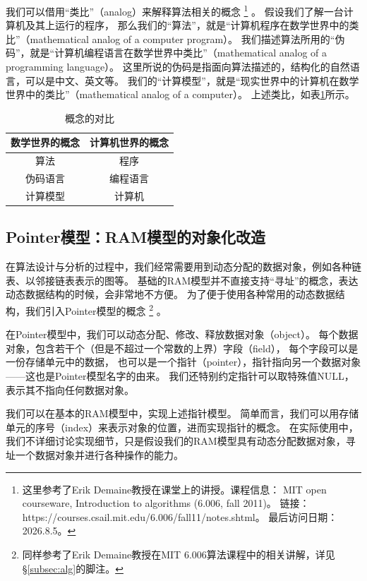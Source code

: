 我们可以借用“类比”（analog）来解释算法相关的概念
    \footnote{这里参考了Erik Demaine教授在课堂上的讲授。课程信息：
    MIT open courseware, Introduction to algorithms (6.006, fall 2011)。
    链接：https://courses.csail.mit.edu/6.006/fall11/notes.shtml。
    最后访问日期：2026.8.5。}
    。
假设我们了解一台计算机及其上运行的程序，
%
那么我们的“算法”，就是“计算机程序在数学世界中的类比”（mathematical analog of a computer program）。
%
我们描述算法所用的“伪码”，就是“计算机编程语言在数学世界中类比”（mathematical analog of a programming language）。
这里所说的伪码是指面向算法描述的，结构化的自然语言，可以是中文、英文等。
%
我们的“计算模型”，就是“现实世界中的计算机在数学世界中的类比”（mathematical analog of a computer）。
上述类比，如表\ref{tab:analog}所示。

\begin{table}[htbp]
    \centering
    \caption{概念的对比}
    \label{tab:analog}
    \begin{tabular}{c|c}
        \toprule
        \textbf{数学世界的概念} & \textbf{计算机世界的概念} \\
        \midrule
        算法 & 程序 \\
        伪码语言 & 编程语言 \\
        计算模型 & 计算机 \\
        \bottomrule
    \end{tabular}
\end{table}

\subsection{Pointer模型：RAM模型的对象化改造}

在算法设计与分析的过程中，我们经常需要用到动态分配的数据对象，例如各种链表、以邻接链表表示的图等。
基础的RAM模型并不直接支持“寻址”的概念，表达动态数据结构的时候，会非常地不方便。
为了便于使用各种常用的动态数据结构，我们引入Pointer模型的概念
    \footnote{同样参考了Erik Demaine教授在MIT 6.006算法课程中的相关讲解，详见\S\ref{subsec:alg}的脚注。}
    。

在Pointer模型中，我们可以动态分配、修改、释放数据对象（object）。
每个数据对象，包含若干个（但是不超过一个常数的上界）字段（field），
每个字段可以是一份存储单元中的数据，
也可以是一个指针（pointer），指针指向另一个数据对象——这也是Pointer模型名字的由来。
我们还特别约定指针可以取特殊值NULL，表示其不指向任何数据对象。

我们可以在基本的RAM模型中，实现上述指针模型。
简单而言，我们可以用存储单元的序号（index）来表示对象的位置，进而实现指针的概念。
在实际使用中，我们不详细讨论实现细节，只是假设我们的RAM模型具有动态分配数据对象，寻址一个数据对象并进行各种操作的能力。

